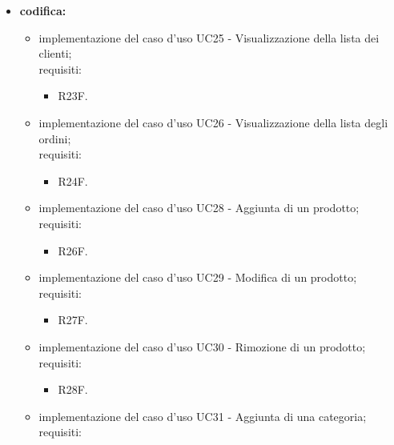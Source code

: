 \begin{itemize}
    \item \textbf{codifica:}
          \begin{itemize}
              \item implementazione del caso d'uso UC25 - Visualizzazione della lista dei clienti;\\
                    requisiti:
                    \begin{itemize}
                        \item R23F.
                    \end{itemize}
              \item implementazione del caso d'uso UC26 - Visualizzazione della lista degli ordini;\\
                    requisiti:
                    \begin{itemize}
                        \item R24F.
                    \end{itemize}
              \item implementazione del caso d'uso UC28 -  Aggiunta di un prodotto;\\
                    requisiti:
                    \begin{itemize}
                        \item R26F.
                    \end{itemize}
              \item implementazione del caso d'uso UC29 - Modifica di un prodotto;\\
                    requisiti:
                    \begin{itemize}
                        \item R27F.
                    \end{itemize}
              \item implementazione del caso d'uso UC30 - Rimozione di un prodotto;\\
                    requisiti:
                    \begin{itemize}
                        \item R28F.
                    \end{itemize}
              \item implementazione del caso d'uso UC31 -  Aggiunta di una categoria;\\
                    requisiti:
                    \begin{itemize}

\end{itemize}
\end{itemize}
\end{itemize}
